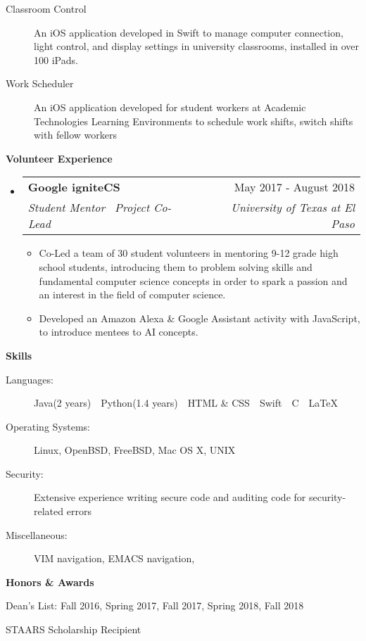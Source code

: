 \documentclass[letterpaper,10pt]{article}
\makeatletter
\newcommand{\resitem}[1]{\item #1 \vspace{-2pt}}
\newcommand{\resheading}[1]{{\large \colorbox{mygrey}{\begin{minipage}{\textwidth}{\textbf{#1 \vphantom{p\^{E}}}}\end{minipage}}}}
\newcommand{\ressubheading}[4]{
\begin{tabular*}{7.0in}{l@{\extracolsep{\fill}}r}
		\textbf{#1} & #2 \\
		\textit{#3} & \textit{#4} \\
\end{tabular*}\vspace{-6pt}}
\makeatother
\begin{document}
\begin{description}
\item[Classroom Control] An iOS application developed in Swift to manage computer connection, light control, and display settings in university classrooms, installed in over 100 iPads.
\item[Work Scheduler] An iOS application developed for student workers at Academic Technologies Learning Environments to schedule work shifts, switch shifts with fellow workers

\end{description}
\resheading{Volunteer Experience}
\begin{itemize}
	\item
	\ressubheading{Google igniteCS}{May 2017 - August 2018}{Student Mentor \textbar\  Project Co-Lead}{University of Texas at El Paso}
	\begin{itemize}
		\resitem{Co-Led a team of 30 student volunteers in mentoring 9-12 grade high school students, introducing them to problem solving skills and fundamental computer science concepts in order to spark a passion and an interest in the field of computer science.}
		\resitem{Developed an Amazon Alexa \& Google Assistant activity with JavaScript, to introduce mentees to AI concepts.}
	\end{itemize}
\end{itemize}


\resheading{Skills}

\begin{description}
\item[Languages:]
Java(2 years)\ \textbar\ Python(1.4 years)\ \textbar\ HTML \& CSS\ \textbar\ Swift\ \textbar\ C\ \textbar\ LaTeX
\item[Operating Systems:]
Linux, OpenBSD, FreeBSD, Mac OS X, {\sc UNIX}
\item[Security:]
Extensive experience writing secure code and auditing code for security-related errors
\item[Miscellaneous:]
VIM navigation, EMACS navigation, 
\end{description}

\resheading{Honors \& Awards}
\begin{description}
	\item Dean's List: Fall 2016, Spring 2017, Fall 2017, Spring 2018, Fall 2018
	\item STAARS Scholarship Recipient
\end{description}
\end{document}
